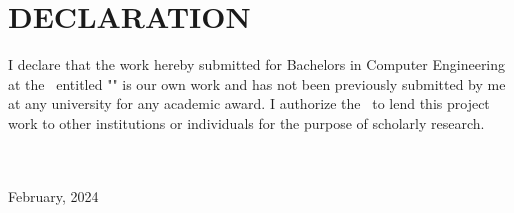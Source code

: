 \section*{DECLARATION}
\vspace{0.5cm}

I declare that the work hereby submitted for Bachelors in Computer Engineering at the \thecampus \ entitled "\textbf{\thetitle}" is our own work and has not been previously submitted by
me at any university for any academic award.
I authorize the \thecampus \ to lend this project work
to other institutions or individuals for the purpose of scholarly research.

\vspace{1cm}
\noindent\textbf{ {\theauthor}}\\
\\
February, 2024
